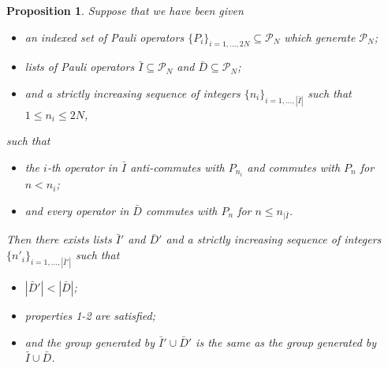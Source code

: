 \documentclass[twocolumn,showpacs,preprintnumbers,amsmath,amssymb,nofootinbib,pra,floatfix]{revtex4}
\newtheorem{proposition}{Proposition}
\newcommand{\lst}{\bar}
\begin{document}
\begin{proposition}
\label{make-independent-using-elimination}
Suppose that we have been given
\begin{itemize}
\item an indexed set of Pauli operators $\{P_i\}_{i=1,\dots,2N}\subseteq \mathscr{P}_N$ which generate $\mathscr{P}_N$;
\item lists of Pauli operators $\lst I\subseteq \mathscr{P}_N$ and  $\lst D\subseteq \mathscr{P}_N$;
\item and a strictly increasing sequence of integers $\{n_i\}_{i=1,\dots,|\lst I|}$ such that $1\le n_i \le 2N$,
\end{itemize}
such that
\begin{itemize}
\item \label{independent-of-below} the $i$-th operator in $\lst I$ anti-commutes with $P_{n_i}$ and commutes with $P_n$ for $n<n_i$;
\item \label{empty-of-paulis-before-index} and every operator in $\lst D$ commutes with $P_n$ for $n\le n_{|\lst I}$.
\end{itemize}
Then there exists lists $\lst I'$ and $\lst D'$ and a strictly increasing sequence of integers $\{n'_i\}_{i=1,\dots,|\lst I'|}$ such that
\begin{itemize}
\item $|\lst D'|<|\lst D|$;
\item properties 1-2 are satisfied;
\item and the group generated by $\lst I'\cup \lst D'$ is the same as the group generated by $\lst I \cup \lst D$.
\end{itemize}
\end{proposition}
\end{document}
